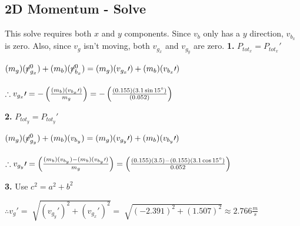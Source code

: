 \documentclass{article}
\begin{document}
\begin{adjustwidth}{1cm}{0pt}
    \subsection*{2D Momentum - Solve}
    This solve requires both $x$ and $y$ components. Since $v_{b}$ only has a $y$ direction, $v_{b_{x}}$ is zero. Also, since $v_{g}$ isn't moving, both $v_{g_{x}}$ and $v_{g_{y}}$ are zero.\newline\newline
    \textbf{1.} $P_{tot_{x}} = P_{tot_{x}}\prime$ \\
    \begin{adjustwidth}{0.6cm}{0pt}
        $(m_{g})(\cancel{v}_{g_{x}}^0) + (m_{b})(\cancel{v}_{b_{x}}^0) = (m_{g})(v_{g_{x}}\prime) + (m_{b})(v_{b_{x}}\prime)$ \\\\
        $\therefore v_{g_{x}}\prime = -\left(\frac{(m_{b})(v_{b_{x}}\prime)}{m_{g}}\right) = -\left(\frac{(0.155)(3.1\sin15\degree)}{(0.052)}\right)$
    \end{adjustwidth}\vspace*{15pt}
    \textbf{2.} $P_{tot_{y}} = P_{tot_{y}}\prime$ \\
    \begin{adjustwidth}{0.6cm}{0pt}
        $(m_{g})(\cancel{v}_{g_{y}}^0) + (m_{b})(v_{b_{y}}) = (m_{g})(v_{g_{y}}\prime) + (m_{b})(v_{b_{y}}\prime)$ \\\\
        $\therefore v_{g_{y}}\prime = \left(\frac{(m_{b})(v_{b_{y}}) - (m_{b})(v_{b_{y}}\prime)}{m_{g}}\right) = \left(\frac{(0.155)(3.5) - (0.155)(3.1\cos15\degree)}{0.052}\right)$
    \end{adjustwidth}\vspace*{15pt}
    \noindent\textbf{3.} Use $c^2 = a^2 + b^2$ \\
    \begin{adjustwidth}{0.6cm}{0pt}
        $\therefore v_{g}\prime = \sqrt[]{{(v_{g_{y}}\prime)}^2 + {(v_{g_{x}}\prime)}^2} = \sqrt[]{{(-2.391)}^2 + {(1.507)}^2} \approx 2.766 \frac{m}{s} $
    \end{adjustwidth}
\end{adjustwidth}


\end{document}
